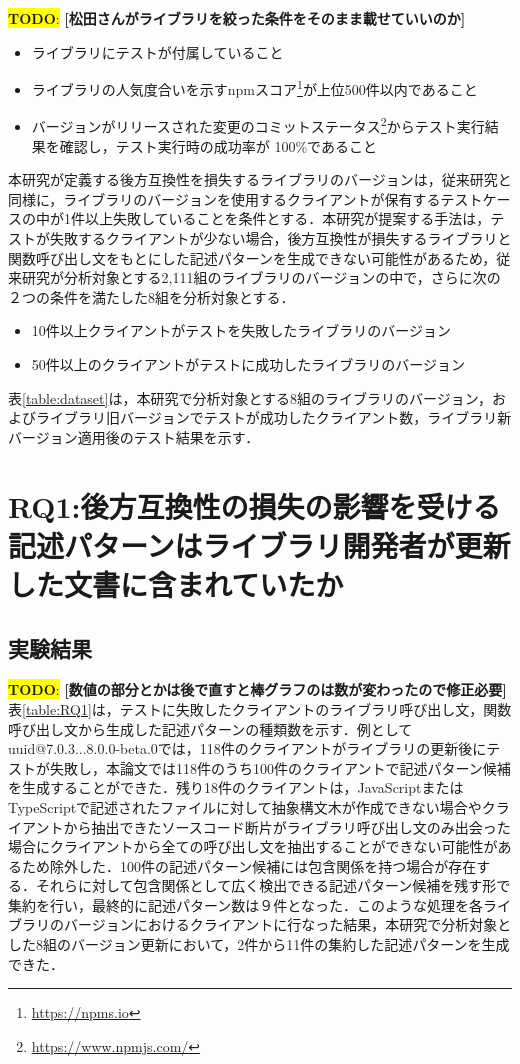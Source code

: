 \documentclass[11pt]{jreport}
\newcommand{\RQOne}{後方互換性の損失の影響を受ける記述パターンはライブラリ開発者が更新した文書に含まれていたか}
\newcommand{\todo}[1]{\colorbox{yellow}{{\bf TODO}:}{\color{red} {\textbf{[#1]}}}}
\begin{document}
\todo{松田さんがライブラリを絞った条件をそのまま載せていいのか}
\begin{itemize}
\item ライブラリにテストが付属していること
\item ライブラリの人気度合いを示すnpmスコア\footnote{\url{https://npms.io}}が上位500件以内であること
\item バージョンがリリースされた変更のコミットステータス\footnote{\url{https://www.npmjs.com/}}からテスト実行結果を確認し，テスト実行時の成功率が 100\%であること
\end{itemize}

本研究が定義する後方互換性を損失するライブラリのバージョンは，従来研究\cite{mujahid}と同様に，ライブラリのバージョンを使用するクライアントが保有するテストケースの中が1件以上失敗していることを条件とする．本研究が提案する手法は，テストが失敗するクライアントが少ない場合，後方互換性が損失するライブラリと関数呼び出し文をもとにした記述パターンを生成できない可能性があるため，従来研究\cite{matsuda}が分析対象とする2,111組のライブラリのバージョンの中で，さらに次の２つの条件を満たした8組を分析対象とする．
\begin{itemize}
\item 10件以上クライアントがテストを失敗したライブラリのバージョン
\item 50件以上のクライアントがテストに成功したライブラリのバージョン
\end{itemize}
表\ref{table:dataset}は，本研究で分析対象とする8組のライブラリのバージョン，およびライブラリ旧バージョンでテストが成功したクライアント数，ライブラリ新バージョン適用後のテスト結果を示す．

\section{RQ1:\RQOne}\label{sec:RQ1}


\subsection{実験結果}
\todo{数値の部分とかは後で直すと棒グラフのは数が変わったので修正必要}
表\ref{table:RQ1}は，テストに失敗したクライアントのライブラリ呼び出し文，関数呼び出し文から生成した記述パターンの種類数を示す．例としてuuid@7.0.3...8.0.0-beta.0では，118件のクライアントがライブラリの更新後にテストが失敗し，本論文では118件のうち100件のクライアントで記述パターン候補を生成することができた．残り18件のクライアントは，JavaScriptまたはTypeScriptで記述されたファイルに対して抽象構文木が作成できない場合やクライアントから抽出できたソースコード断片がライブラリ呼び出し文のみ出会った場合にクライアントから全ての呼び出し文を抽出することができない可能性があるため除外した．100件の記述パターン候補には包含関係を持つ場合が存在する．それらに対して包含関係として広く検出できる記述パターン候補を残す形で集約を行い，最終的に記述パターン数は９件となった．このような処理を各ライブラリのバージョンにおけるクライアントに行なった結果，本研究で分析対象とした8組のバージョン更新において，2件から11件の集約した記述パターンを生成できた．
\end{document}
